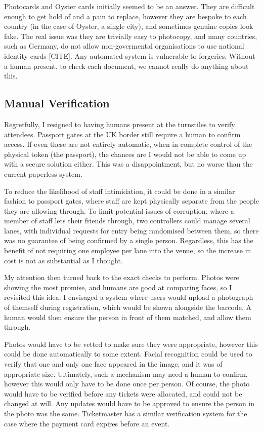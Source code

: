 \documentclass[12pt]{bhamdissertation}
\begin{document}
Photocards and Oyster cards initially seemed to be an answer. They are difficult enough to get hold of and a pain to replace, however they are bespoke to each country (in the case of Oyster, a single city), and sometimes genuine copies look fake. The real issue was they are trivially easy to photocopy, and many countries, such as Germany, do not allow non-govermental organisations to use national identity cards [CITE]. Any automated system is vulnerable to forgeries. Without a human present, to check each document, we cannot really do anything about this.

\subsection{Manual Verification}

Regretfully, I resigned to having humans present at the turnstiles to verify attendees. Passport gates at the UK border still require a human to confirm access. If even these are not entirely automatic, when in complete control of the physical token (the passport), the chances are I would not be able to come up with a secure solution either. This was a disappointment, but no worse than the current paperless system.

To reduce the likelihood of staff intimidation, it could be done in a similar fashion to passport gates, where staff are kept physically separate from the people they are allowing through. To limit potential issues of corruption, where a member of staff lets their friends through, two controllers could manage several lanes, with individual requests for entry being randomised between them, so there was no guarantee of being confirmed by a single person. Regardless, this has the benefit of not requiring one employee per lane into the venue, so the increase in cost is not as substantial as I thought.

My attention then turned back to the exact checks to perform. Photos were showing the most promise, and humans are good at comparing faces, so I revisited this idea. I envisaged a system where users would upload a photograph of themself during registration, which would be shown alongside the barcode. A human would then ensure the person in front of them matched, and allow them through.

Photos would have to be vetted to make sure they were appropriate, however this could be done automatically to some extent. Facial recognition could be used to verify that one and only one face appeared in the image, and it was of appropriate size. Ultimately, such a mechanism may need a human to confirm, however this would only have to be done once per person. Of course, the photo would have to be verified before any tickets were allocated, and could not be changed at will. Any updates would have to be approved to ensure the person in the photo was the same. Ticketmaster has a similar verification system for the case where the payment card expires before an event.
\end{document}

